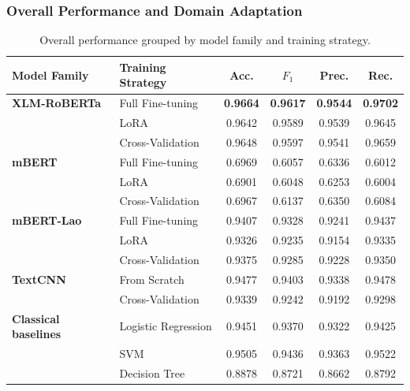 \documentclass[conference, onecolumn]{IEEEtran}
\begin{document}
\subsubsection{Overall Performance and Domain Adaptation}
\begin{table}[!htbp]
\centering
\caption{Overall performance grouped by model family and training strategy.}
\small
\renewcommand{\arraystretch}{1.2}
\setlength{\tabcolsep}{6pt}

\begin{tabular}{|p{}|p{}|
S[table-format=1.4]|
S[table-format=1.4]|
S[table-format=1.4]|
S[table-format=1.4]|}

\hline
\textbf{Model Family} & \textbf{Training Strategy} & \textbf{Acc.} & \textbf{$F_1$} & \textbf{Prec.} & \textbf{Rec.} \\
\hline

{\textbf{XLM-RoBERTa}}
& Full Fine-tuning & {\bfseries 0.9664} & {\bfseries 0.9617} & {\bfseries 0.9544} & {\bfseries 0.9702} \\
& LoRA & 0.9642 & 0.9589 & 0.9539 & 0.9645 \\
& Cross-Validation & 0.9648 & 0.9597 & 0.9541 & 0.9659 \\
\hline

{\textbf{mBERT}}
& Full Fine-tuning & 0.6969 & 0.6057 & 0.6336 & 0.6012 \\
& LoRA & 0.6901 & 0.6048 & 0.6253 & 0.6004 \\
& Cross-Validation & 0.6967 & 0.6137 & 0.6350 & 0.6084 \\
\hline

{\textbf{mBERT-Lao}}
& Full Fine-tuning & 0.9407 & 0.9328 & 0.9241 & 0.9437 \\
& LoRA & 0.9326 & 0.9235 & 0.9154 & 0.9335 \\
& Cross-Validation & 0.9375 & 0.9285 & 0.9228 & 0.9350 \\
\hline

{\textbf{TextCNN}}
& From Scratch & 0.9477 & 0.9403 & 0.9338 & 0.9478 \\
& Cross-Validation & 0.9339 & 0.9242 & 0.9192 & 0.9298 \\
\hline

{\textbf{Classical baselines}}
& Logistic Regression & 0.9451 & 0.9370 & 0.9322 & 0.9425 \\
& SVM & 0.9505 & 0.9436 & 0.9363 & 0.9522 \\
& Decision Tree & 0.8878 & 0.8721 & 0.8662 & 0.8792 \\
\hline

\end{tabular}

\label{tab:overall_results}
\end{table}
\end{document}
